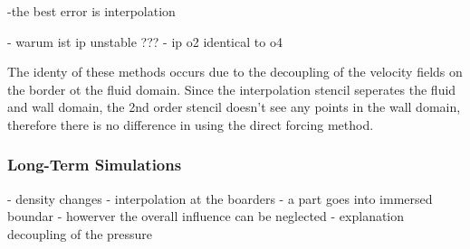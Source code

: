-the best error is interpolation

- warum ist ip unstable ???
- ip o2 identical to o4


 The identy of these methods occurs due to the decoupling of the velocity fields
on the border ot the fluid domain. Since the interpolation stencil seperates the fluid and wall domain, the 2nd order
stencil doesn't see any points in the wall domain, therefore there is no difference in using the direct forcing method.\\

\subsubsection{Long-Term Simulations}
- density changes
- interpolation at the boarders
- a part goes into immersed boundar
- howerver the overall influence can be neglected
- explanation decoupling of the pressure


